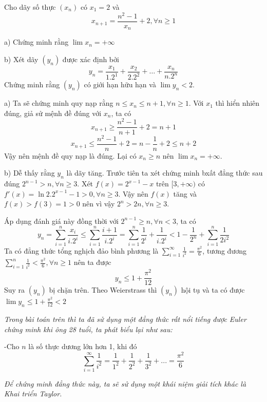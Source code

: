 \documentclass[11pt]{scrartcl}
\begin{document}
\begin{itemize}[label=, leftmargin=0em, itemsep=0.5em]
    \begin{bt}
        Cho dãy số thực $(x_n)$ có $x_1 = 2$ và
        \[x_{n + 1} = \frac{n^2- 1}{x_n} + 2, \forall n \geq 1\]


        a) Chứng minh rằng $\lim x_n = +\infty$


        b) Xét dãy $(y_n)$ được xác định bởi
        \[y_n = \frac{x_1}{1.2^1} + \frac{x_2}{2.2^2} + \dots + \frac{x_n}{n.2^n}\]
        Chứng minh rằng $(y_n)$ có giới hạn hữu hạn và $\lim y_n < 2$.
        
    \end{bt}

    \begin{sol}
        a) Ta sẽ chứng minh quy nạp rằng $n \leq x_n \leq n + 1, \forall n \geq 1$. Với $x_1$ thì hiển nhiên đúng, giả sử mệnh đề đúng với $x_n$, ta có 
        \[x_{n + 1} \geq \frac{n^2 - 1}{n + 1} + 2 = n + 1\]
        \[x_{n + 1} \leq \frac{n^2 - 1}{n} + 2 = n - \frac{1}{n} +2 \leq n + 2\]
        Vậy nên mệnh đề quy nạp là đúng. Lại có $x_n \geq n$ nên $\lim x_n = +\infty$.


        b) Dễ thấy rằng $y_n$ là dãy tăng. Trước tiên ta xét chứng minh bxất đẳng thức sau đúng $ 2^{n - 1} > n, \forall n \geq 3$. Xét $f(x) = 2^{x - 1} - x$ trên $[3,+\infty)$ có $f'(x) = \ln2.2^{x - 1} - 1 > 0, \forall n \geq 3$. Vậy nên $f(x)$ tăng và $f(x) > f(3) = 1 > 0$ nên vì vậy $2^n > 2n, \forall n \geq 3$.
        
        
        Áp dụng đánh giá này đồng thời với $ 2^{n - 1} \geq n, \forall n < 3$, ta có 
        $$
        y_n = \sum_{i = 1}^n \frac{x_i}{i.2^i} \leq \sum_{i = 1}^n \frac{i + 1}{i.2^i} = 
        \sum_{i = 1}^n \frac{1}{2^i} + \frac{1}{i.2^i} < 1 - \frac{1}{2^{n}}+ \sum_{i = 1}^n \frac{1}{2i^2}
        $$
        Ta có đẳng thức tổng nghịch đảo bình phương là $\displaystyle \sum_{i = 1}^{\infty} \frac{1}{i^2} = \frac{\pi^2}{6}$, tương đương $\displaystyle \sum_{i = 1}^{n} \frac{1}{i^2} < \frac{\pi^2}{6}, \forall n \geq 1$ nên ta được
        \[y_n \leq 1 + \frac{\pi^2}{12} \]
        Suy ra $(y_n)$ bị chặn trên. Theo Weierstrass thì $(y_n)$ hội tụ và ta có được $\lim y_n \leq 1 + \frac{\pi^2}{12} < 2$
    \end{sol}

        \begin{sol} \textit{Trong bài toán trên thì ta đã sử dụng một đẳng thức rất nổi tiếng được Euler chứng minh khi ông 28 tuổi, ta phát biểu lại như sau:}


        \begin{theo}
            -Cho $n$ là số thực dương lớn hơn 1, khi đó
            \[\sum_{i = 1}^{\infty} \frac{1}{i^2} = \frac{1}{1^2} + \frac{1}{2^2} + \frac{1}{3^2} + ... = \frac{\pi^2}{6}
            \]
        \end{theo}
        \textit{Để chứng minh đẳng thức này, ta sẽ sử dụng một khái niệm giải tích khác là Khai triển Taylor.}


\end{sol}
\end{itemize}
\end{document}
